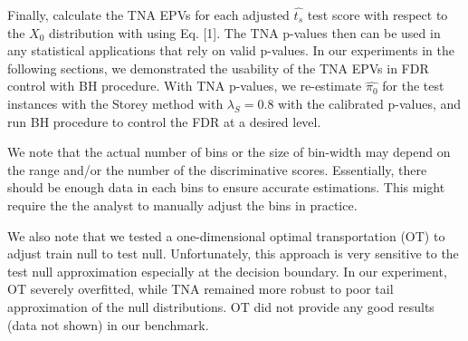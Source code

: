 \documentclass{article}
\newcommand{\edit}[1]{{\color{red}#1}}
\begin{document}
	Finally, calculate the TNA EPVs for each adjusted $\hat{t_s}$ test score with respect to the $X_0$ distribution with using Eq. [1]. \edit{The TNA p-values then can be used in any statistical applications that rely on valid p-values. In our experiments in the following sections, we demonstrated the usability of the TNA EPVs in FDR control with BH procedure. With TNA p-values, we re-estimate $\hat{\pi_0}$ for the test instances with the Storey method with $\lambda_S= 0.8$ with the calibrated p-values}, and run BH procedure to control the FDR at a desired level. 
	
	\edit{We note that the actual number of bins or the size of bin-width may depend on the range and/or the number of the discriminative scores. Essentially, there should be enough data in each bins to ensure accurate estimations. This might require the the analyst to manually adjust the bins in practice.}
	
	We also note that we tested a one-dimensional optimal transportation (OT) to adjust train null to test null. Unfortunately, this approach is very sensitive to the test null approximation especially at the decision boundary. In our experiment, OT severely overfitted, while TNA remained more robust to poor tail approximation of the null distributions. OT did not provide any good results (data not shown) in our benchmark. 
	
\end{document}
